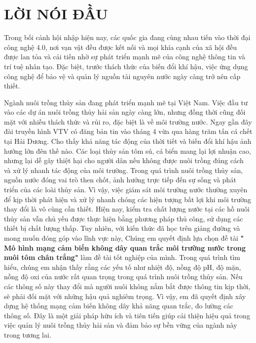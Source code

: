 \section*{LỜI NÓI ĐẦU}
\thispagestyle{empty}
Trong bối cảnh hội nhập hiện nay, các quốc gia đang cùng nhau tiến vào thời đại công nghệ 4.0, nơi vạn vật đều được kết nối và mọi khía cạnh của xã hội đều được lan tỏa và cải tiến nhờ sự phát triển mạnh mẽ của công nghệ thông tin và trí tuệ nhân tạo. Đặc biệt, trước thách thức của biến đổi khí hậu, việc ứng dụng công nghệ để bảo vệ và quản lý nguồn tài nguyên nước ngày càng trở nên cấp thiết.

Ngành nuôi trồng thủy sản đang phát triển mạnh mẽ tại Việt Nam. Việc đầu tư vào các dự án nuôi trồng thủy hải sản ngày càng lớn, nhưng đồng thời cũng đối mặt với nhiều thách thức và rủi ro, đặc biệt là về môi trường nước. Ngay gần đây đài truyền hình VTV có đăng bản tin vào tháng 4 vừa qua hàng trăm tấn cá chết tại Hải Dương. Cho thấy khả năng tác động của thời tiết và biến đổi khí hậu ảnh hưởng lớn đên thế nào. Các loại thủy sản tôm sú, cá biển mang lại lợi nhuận cao, nhưng lại dễ gây thiệt hại cho người dân nếu không được nuôi trồng đúng cách và xử lý nhanh tác động của môi trường. Trong quá trình nuôi trồng thủy sản, nguồn nước đóng vai trò then chốt, ảnh hưởng trực tiếp đến sự sống và phát triển của các loài thủy sản. Vì vậy, việc giám sát môi trường nước thường xuyên để kịp thời phát hiện và xử lý nhanh chóng các hiện tượng bất lợi khi môi trường thay đổi là vô cùng cần thiết. Hiện nay, kiểm tra chất lượng nước tại các hồ nuôi thủy sản vẫn chủ yếu được thực hiện bằng phương pháp thủ công, sử dụng các thiết bị chất lượng thấp. Tuy nhiên, với kiến thức đã học trên giảng đường và mong muốn đóng góp vào lĩnh vực này, Chúng em quyết định lựa chọn đề tài \textbf{" Mô hình mạng cảm biến không dây quan trắc môi trường nước trong nuôi tôm chân trắng"} làm đề tài tốt nghiệp của mình. Trong quá trình tìm hiểu,  chúng em nhận thấy rằng các yếu tố như nhiệt độ, nồng độ pH, độ mặn, nồng độ oxi của nước rất quan trọng trong quá trình nuôi trồng thủy sản. Nếu các thông số này thay đổi mà người nuôi không nắm bắt được thông tin kịp thời, sẽ phải đối mặt với những hậu quả nghiêm trọng. Vì vậy, em đã quyết định xây dựng hệ thống mạng cảm biến không dây khả năng quan trắc, đo lường các thông số. Đây là một giải pháp hữu ích và tiên tiến giúp cải thiện hiệu quả trong việc quản lý nuôi trồng thủy hải sản và đảm bảo sự bền vững của ngành này trong tương lai.
\cleardoublepage
